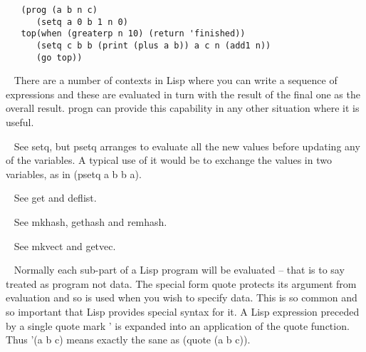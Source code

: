 \begin{description}
{\begin{verbatim}
   (prog (a b n c)
      (setq a 0 b 1 n 0)
   top(when (greaterp n 10) (return 'finished))
      (setq c b b (print (plus a b)) a c n (add1 n))
      (go top))
\end{verbatim}}
\item[{\tx progn~~~~~~~~} \hspace{1cm} {\em special form}]~\newline
There are a number of contexts in Lisp where you can write a sequence of
expressions and these are evaluated in turn with the result of the
final one as the overall result. {\tx progn} can provide this capability
in any other situation where it is useful.
\item[{\tx psetq~~~~~~~~} \hspace{1cm} {\em macro}]~\newline
See {\tx setq}, but {\tx psetq} arranges to evaluate all the new values before
updating any of the variables. A typical use of it would be to exchange the
values in two variables, as in {\tx (psetq a b b a)}.
\item[{\tx put~~~~~~~~~~} \hspace{1cm} {\em function 3 args}]~\newline
See {\tx get} and {\tx deflist}.
\item[{\tx puthash~~~~~~} \hspace{1cm} {\em function 3 args}]~\newline
See {\tx mkhash}, {\tx gethash} and {\tx remhash}.
\item[{\tx putv~~~~~~~~~} \hspace{1cm} {\em function 3 args}]~\newline
See {\tx mkvect} and {\tx getvec}.
\item[{\tx quote~~~~~~~~} \hspace{1cm} {\em special form}]~\newline
Normally each sub-part of a Lisp program will be evaluated -- that is to say
treated as program not data. The special form {\tx quote} protects its
argument from evaluation and so is used when you wish to specify data.
This is so common and so important that Lisp provides special syntax for it.
A Lisp expression preceded by a single quote mark {\tx '} is expanded into
an application of the {\tx quote} function. Thus {\tx '(a b c)} means
exactly the sane as {\tx (quote (a b c))}.
\item[{\tx quotient~~~~~} \hspace{1cm} {\em function 2 args}]~\newline

\end{description}
